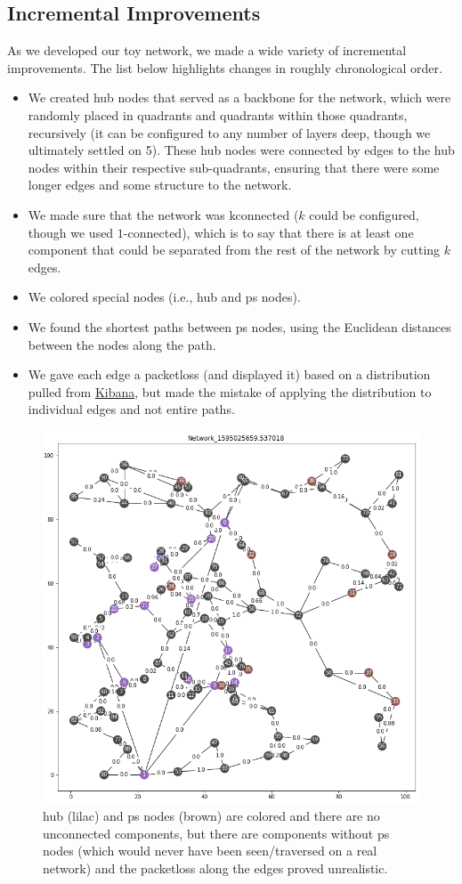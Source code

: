 \documentclass{finalreport}
\begin{document}
\subsection*{Incremental Improvements}

As we developed our toy network, we made a wide variety of incremental improvements. The list below highlights changes in roughly chronological order.

\begin{itemize}
    \item We created \gls{hub} nodes that served as a backbone for the network, which were randomly placed in quadrants and quadrants within those quadrants, recursively (it can be configured to any number of layers deep, though we ultimately settled on 5). These hub nodes were connected by edges to the hub nodes within their respective sub-quadrants, ensuring that there were some longer edges and some structure to the network.
    \item We made sure that the network was \gls{kconnected} ($k$ could be configured, though we used $1$-connected), which is to say that there is at least one \gls{component} that could be separated from the rest of the network by cutting $k$ edges.
    \item We colored special nodes (i.e., \gls{hub} and \gls{ps} nodes).
    \item We found the shortest paths between \gls{ps} nodes, using the Euclidean distances between the nodes along the path.
    \item We gave each edge a \gls{packetloss} (and displayed it) based on a distribution pulled from \hyperref[kibana]{Kibana}, but made the mistake of applying the distribution to individual edges and not entire paths.
\end{itemize}

\begin{figure}[!ht]
\centering
\includegraphics[width=.8\linewidth]{week_2/NetworkZero.png}
\caption{\Gls{hub} (lilac) and \gls{ps} nodes (brown) are colored and there are no unconnected \glspl{component}, but there are components without \gls{ps} nodes (which would never have been seen/traversed on a real network) and the \gls{packetloss} along the edges proved unrealistic.}
\end{figure}
\end{document}
